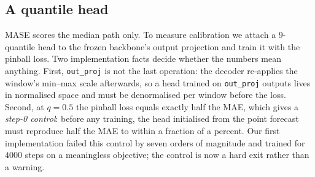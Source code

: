 \subsection{A quantile head}
\label{sec:method:quantile}

MASE scores the median path only. To measure calibration we attach a
$9$-quantile head to the frozen backbone's output projection and train it with
the pinball loss. Two implementation facts decide whether the numbers mean
anything. First, \texttt{out\_proj} is not the last operation: the decoder
re-applies the window's min--max scale afterwards, so a head trained on
\texttt{out\_proj} outputs lives in normalised space and must be denormalised
per window before the loss. Second, at $q=0.5$ the pinball loss equals exactly
half the MAE, which gives a \emph{step-0 control}: before any training, the
head initialised from the point forecast must reproduce half the MAE to within
a fraction of a percent. Our first implementation failed this control by seven
orders of magnitude and trained for $4000$ steps on a meaningless objective;
the control is now a hard exit rather than a warning.
